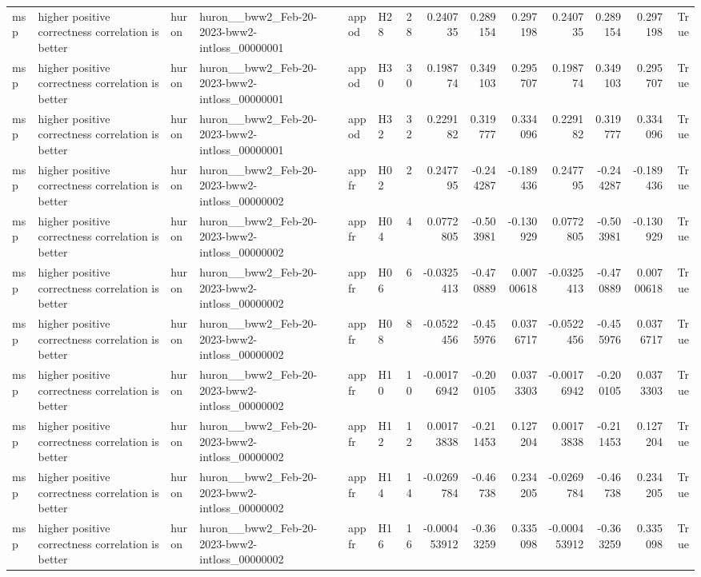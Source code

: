 \begin{longtable}{llllllrrrrrrrr}
msp & higher positive correctness correlation is better & huron & huron\_\_bww2\_Feb-20-2023-bww2-intloss\_00000001 & appod & H28 & 28 & 0.240735 & 0.289154 & 0.297198 & 0.240735 & 0.289154 & 0.297198 & True \\
msp & higher positive correctness correlation is better & huron & huron\_\_bww2\_Feb-20-2023-bww2-intloss\_00000001 & appod & H30 & 30 & 0.198774 & 0.349103 & 0.295707 & 0.198774 & 0.349103 & 0.295707 & True \\
msp & higher positive correctness correlation is better & huron & huron\_\_bww2\_Feb-20-2023-bww2-intloss\_00000001 & appod & H32 & 32 & 0.229182 & 0.319777 & 0.334096 & 0.229182 & 0.319777 & 0.334096 & True \\
msp & higher positive correctness correlation is better & huron & huron\_\_bww2\_Feb-20-2023-bww2-intloss\_00000002 & appfr & H02 & 2 & 0.247795 & -0.244287 & -0.189436 & 0.247795 & -0.244287 & -0.189436 & True \\
msp & higher positive correctness correlation is better & huron & huron\_\_bww2\_Feb-20-2023-bww2-intloss\_00000002 & appfr & H04 & 4 & 0.0772805 & -0.503981 & -0.130929 & 0.0772805 & -0.503981 & -0.130929 & True \\
msp & higher positive correctness correlation is better & huron & huron\_\_bww2\_Feb-20-2023-bww2-intloss\_00000002 & appfr & H06 & 6 & -0.0325413 & -0.470889 & 0.00700618 & -0.0325413 & -0.470889 & 0.00700618 & True \\
msp & higher positive correctness correlation is better & huron & huron\_\_bww2\_Feb-20-2023-bww2-intloss\_00000002 & appfr & H08 & 8 & -0.0522456 & -0.455976 & 0.0376717 & -0.0522456 & -0.455976 & 0.0376717 & True \\
msp & higher positive correctness correlation is better & huron & huron\_\_bww2\_Feb-20-2023-bww2-intloss\_00000002 & appfr & H10 & 10 & -0.00176942 & -0.200105 & 0.0373303 & -0.00176942 & -0.200105 & 0.0373303 & True \\
msp & higher positive correctness correlation is better & huron & huron\_\_bww2\_Feb-20-2023-bww2-intloss\_00000002 & appfr & H12 & 12 & 0.00173838 & -0.211453 & 0.127204 & 0.00173838 & -0.211453 & 0.127204 & True \\
msp & higher positive correctness correlation is better & huron & huron\_\_bww2\_Feb-20-2023-bww2-intloss\_00000002 & appfr & H14 & 14 & -0.0269784 & -0.46738 & 0.234205 & -0.0269784 & -0.46738 & 0.234205 & True \\
msp & higher positive correctness correlation is better & huron & huron\_\_bww2\_Feb-20-2023-bww2-intloss\_00000002 & appfr & H16 & 16 & -0.000453912 & -0.363259 & 0.335098 & -0.000453912 & -0.363259 & 0.335098 & True \\

\end{longtable}
